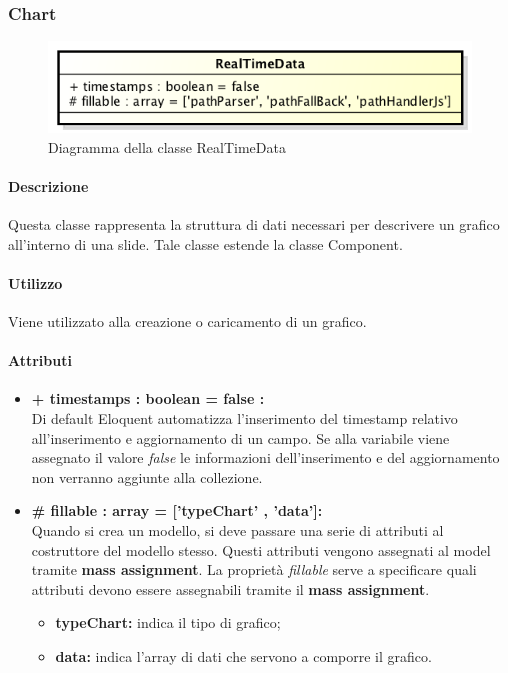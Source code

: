 \subsubsection{Chart}

	\begin{figure}[h]
		\centering
		\includegraphics[width=0.5\linewidth]{img/back_end_premi_model_realTimeData}
		\caption[Diagramma della classe RealTimeData]{Diagramma della classe RealTimeData}
		\label{fig:back_end_premi_model_chart}
	\end{figure}

	\paragraph{Descrizione}
	Questa classe rappresenta la struttura di dati necessari per descrivere un grafico all'interno di una slide. Tale classe estende la classe Component.
	
	\paragraph{Utilizzo}
	Viene utilizzato alla creazione o caricamento di un grafico.

	\paragraph{Attributi}
	\begin{itemize}
		\item \textbf{+ timestamps : boolean = false :}\\
		Di default Eloquent automatizza l'inserimento del timestamp relativo all'inserimento e aggiornamento di un campo. Se alla variabile viene assegnato il valore \textit{false} le informazioni dell'inserimento e del aggiornamento non verranno aggiunte alla collezione.
		\item \textbf{\# fillable : array = [’typeChart’ , ’data’]:}\\
		Quando si crea un modello, si deve passare una serie di attributi al costruttore del modello stesso. Questi attributi vengono assegnati al model tramite \textbf{mass assignment}. La proprietà \textit{fillable} serve a specificare quali attributi devono essere assegnabili tramite il \textbf{mass assignment}.
		\begin{itemize}
			\item \textbf{typeChart:} indica il tipo di grafico;
			\item \textbf{data:} indica l'array di dati che servono a comporre il grafico.
		\end{itemize}
		
	\end{itemize}
\newpage


